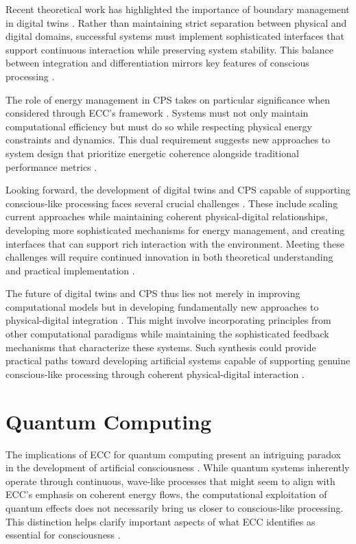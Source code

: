\begin{refsection}
Recent theoretical work has highlighted the importance of boundary management in digital twins \cite{Lee2018}. Rather than maintaining strict separation between physical and digital domains, successful systems must implement sophisticated interfaces that support continuous interaction while preserving system stability. This balance between integration and differentiation mirrors key features of conscious processing \cite{Rajkumar2018}.

The role of energy management in CPS takes on particular significance when considered through ECC's framework \cite{Grieves2021}. Systems must not only maintain computational efficiency but must do so while respecting physical energy constraints and dynamics. This dual requirement suggests new approaches to system design that prioritize energetic coherence alongside traditional performance metrics \cite{Liu2021}.

Looking forward, the development of digital twins and CPS capable of supporting conscious-like processing faces several crucial challenges \cite{Tao2019}. These include scaling current approaches while maintaining coherent physical-digital relationships, developing more sophisticated mechanisms for energy management, and creating interfaces that can support rich interaction with the environment. Meeting these challenges will require continued innovation in both theoretical understanding and practical implementation \cite{Uhlemann2017}.

The future of digital twins and CPS thus lies not merely in improving computational models but in developing fundamentally new approaches to physical-digital integration \cite{Wang2019}. This might involve incorporating principles from other computational paradigms while maintaining the sophisticated feedback mechanisms that characterize these systems. Such synthesis could provide practical paths toward developing artificial systems capable of supporting genuine conscious-like processing through coherent physical-digital interaction \cite{White2021}.

\section{Quantum Computing}

The implications of ECC for quantum computing present an intriguing paradox in the development of artificial consciousness \cite{Aaronson2021a}. While quantum systems inherently operate through continuous, wave-like processes that might seem to align with ECC's emphasis on coherent energy flows, the computational exploitation of quantum effects does not necessarily bring us closer to conscious-like processing. This distinction helps clarify important aspects of what ECC identifies as essential for consciousness \cite{Arute2019}.


\end{refsection}
